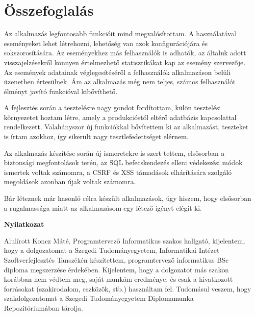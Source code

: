 \documentclass[a4paper,12pt]{report}
\theoremstyle{definition}
\theoremstyle{remark}
\begin{document}
\chapter{Összefoglalás}

Az alkalmazás legfontosabb funkcióit mind megvalósítottam. A használatával eseményeket lehet létrehozni, lehetőség van azok konfigurációjára és sokszorosítására. Az eseményekhez más felhasználók is adhatók, az általuk adott visszajelzésekről könnyen értelmezhető statisztikákat kap az esemény szervezője. Az események adatainak véglegesítéséről a felhasználók alkalmazáson belüli üzenetben értesülnek. Ám az alkalmazás még nem teljes, számos felhasználói élményt javító funkcióval kibővíthető.

A fejlesztés során a tesztelésre nagy gondot fordítottam, külön tesztelési környezetet hoztam létre, amely a produkcióstól eltérő adatbázis kapcsolattal rendelkezett. Valahányszor új funkciókkal bővítettem ki az alkalmazást, teszteket is írtam azokhoz, így sikerült nagy tesztlefedettséget elérnem.

Az alkalmazás készítése során új ismeretekre is szert tettem, elsősorban a biztonsági megfontolások terén, az SQL befecskendezés elleni védekezési módok ismertek voltak számomra, a CSRF és XSS támadások elhárítására szolgáló megoldások azonban újak voltak számomra.

Bár léteznek már hasonló célra készült alkalmazások, úgy hiszem, hogy elsősorban a rugalmassága miatt az alkalmazásom egy létező igényt elégít ki.

\newpage


 

\newpage

\thispagestyle{empty}

{\Huge \bf Nyilatkozat}


\vspace{2 cm}

Alulírott Koncz Máté, Programtervező Informatikus szakos hallgató, kijelentem, hogy a dolgozatomat a Szegedi Tudományegyetem, Informatikai Intézet Szoftverfejlesztés Tanszékén készítettem, programtervező informatikus BSc diploma megszerzése érdekében. 
Kijelentem, hogy a dolgozatot más szakon korábban nem védtem meg, saját munkám eredménye, és csak a hivatkozott forrásokat (szakirodalom, eszközök, stb.) használtam fel. Tudomásul veszem, hogy szakdolgozatomat a Szegedi Tudományegyetem Diplomamunka Repozitóriumában tárolja.
\end{document}
